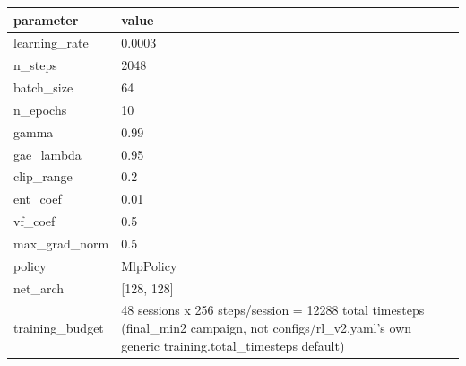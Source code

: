 \begin{tabular}{ll}
\hline
parameter & value \\
\hline
learning\_rate & 0.0003 \\
n\_steps & 2048 \\
batch\_size & 64 \\
n\_epochs & 10 \\
gamma & 0.99 \\
gae\_lambda & 0.95 \\
clip\_range & 0.2 \\
ent\_coef & 0.01 \\
vf\_coef & 0.5 \\
max\_grad\_norm & 0.5 \\
policy & MlpPolicy \\
net\_arch & [128, 128] \\
training\_budget & 48 sessions x 256 steps/session = 12288 total timesteps (final\_min2 campaign, not configs/rl\_v2.yaml's own generic training.total\_timesteps default) \\
\hline
\end{tabular}
